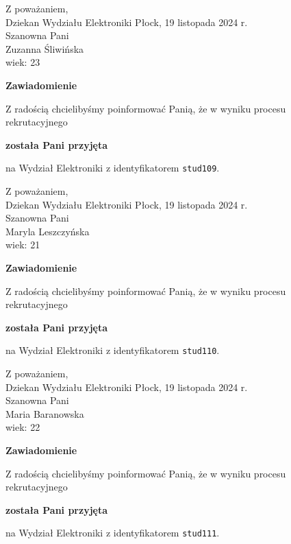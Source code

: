 \documentclass[12pt,a4paper]{article}
\begin{document}
\noindent
Z poważaniem,\\
Dziekan
Wydziału Elektroniki
\newpage
\hfill Płock, 19 listopada 2024 r.\\ 
\noindent 
Szanowna Pani \\
Zuzanna Śliwińska \\
wiek: 23

\bigskip

\begin{center}
{\Large\textbf{Zawiadomienie}}
\end{center}
\bigskip
Z radością chcielibyśmy poinformować Panią, że w wyniku procesu rekrutacyjnego
\begin{center}
\textsf{\textbf{została Pani przyjęta}} 
\end{center}
na Wydział Elektroniki z identyfikatorem \verb|stud109|.
\vspace{2cm}

\noindent
Z poważaniem,\\
Dziekan
Wydziału Elektroniki
\newpage
\hfill Płock, 19 listopada 2024 r.\\ 
\noindent 
Szanowna Pani \\
Maryla Leszczyńska \\
wiek: 21

\bigskip

\begin{center}
{\Large\textbf{Zawiadomienie}}
\end{center}
\bigskip
Z radością chcielibyśmy poinformować Panią, że w wyniku procesu rekrutacyjnego
\begin{center}
\textsf{\textbf{została Pani przyjęta}} 
\end{center}
na Wydział Elektroniki z identyfikatorem \verb|stud110|.
\vspace{2cm}

\noindent
Z poważaniem,\\
Dziekan
Wydziału Elektroniki
\newpage
\hfill Płock, 19 listopada 2024 r.\\ 
\noindent 
Szanowna Pani \\
Maria Baranowska \\
wiek: 22

\bigskip

\begin{center}
{\Large\textbf{Zawiadomienie}}
\end{center}
\bigskip
Z radością chcielibyśmy poinformować Panią, że w wyniku procesu rekrutacyjnego
\begin{center}
\textsf{\textbf{została Pani przyjęta}} 
\end{center}
na Wydział Elektroniki z identyfikatorem \verb|stud111|.
\vspace{2cm}
\end{document}
